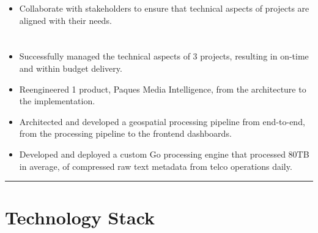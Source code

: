 \documentclass[12pt]{res}
\begin{document}
\begin{resume}
\begin{multicols}{2}
\begin{itemize}
\item Collaborate with stakeholders to ensure that technical aspects of projects are aligned with their needs.
		\end{itemize}
	\section{}
		\begin{itemize}
			\setlength{\itemindent}{0pt}
			\item Successfully managed the technical aspects of 3 projects, resulting in on-time and within budget delivery.

\item Reengineered 1 product, Paques Media Intelligence, from the architecture to the implementation.

\item Architected and developed a geospatial processing pipeline from end-to-end, from the processing pipeline to the frontend dashboards.

\item Developed and deployed a custom Go processing engine that processed 80TB in average, of compressed raw text metadata from telco operations daily.
		\end{itemize}
\end{multicols}

\vspace{-20pt}
\begin{minipage}[t]{0.55\linewidth}
	\rule{0.25\textwidth}{2pt}
	\begin{multicols}{2}
		\section{Technology Stack}
		\columnbreak
		\section{}
	\end{multicols}
	\vspace{1pt}
\end{minipage}
\hfill
\begin{minipage}[t]{0.42\linewidth}
	\vspace{18pt}

\end{minipage}
\end{resume}
\end{document}
